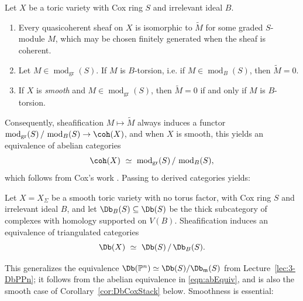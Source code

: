 \documentclass{amsart}
\begin{document}
\begin{prop}\label{prop:sheaf-module}
  Let $X$ be a toric variety with Cox ring $S$ and irrelevant ideal $B$.
  \begin{enumerate}
  \item Every quasicoherent sheaf on $X$ is isomorphic to $\widetilde M$ for some graded $S$-module $M$, which may be chosen finitely generated when the sheaf is coherent.
  \item  Let $M\in\operatorname{mod}_{\mathrm{gr}}(S)$.  If $M$ is $B$-torsion, i.e. if $M\in \operatorname{mod}_B(S)$, then $\widetilde{M}=0$.
  \item If $X$ is \emph{smooth} and $M\in\operatorname{mod}_{\mathrm{gr}}(S)$, then $\widetilde M=0$ if and only if $M$ is $B$-torsion.
  \end{enumerate}
\end{prop}

Consequently, sheafification $M\mapsto \widetilde{M}$ always induces a functor $\operatorname{mod}_{\mathrm{gr}}(S)\,/\,\operatorname{mod}_B(S)\to \coh(X)$, and when $X$ is smooth, this yields an equivalence of abelian categories
\begin{equation}\label{eqn:abEquiv}
\coh(X)\ \simeq\ \operatorname{mod}_{\mathrm{gr}}(S)\,/\,\operatorname{mod}_B(S),
\end{equation}
which follows from Cox's work \cite[\S3]{Cox95}. Passing to derived categories yields:

\begin{thm}\label{thm:coxderived}
  Let $X=X_\Sigma$ be a smooth toric variety with no torus factor, with Cox ring $S$ and irrelevant ideal $B$, and let $\Db_B(S)\subseteq \Db(S)$ be the thick subcategory of complexes with homology supported on $V(B)$. Sheafification induces an equivalence of triangulated categories
  \[
  \Db(X)\ \simeq\ \Db(S)\,/\,\Db_B(S).
  \]
\end{thm}

This generalizes the equivalence $\Db(\PP^n)\simeq \Db(S)/\Db_\m(S)$ from Lecture~\ref{lec:3-DbPPn}; it follows from the abelian equivalence in \eqref{eqn:abEquiv}, and is also the smooth case of Corollary~\ref{cor:DbCoxStack} below. Smoothness is essential:
\end{document}

